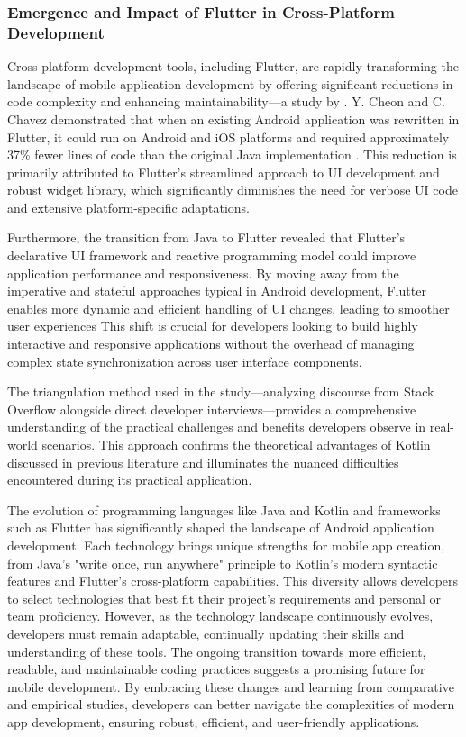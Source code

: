\subsubsection*{Emergence and Impact of Flutter in Cross-Platform Development}
Cross-platform development tools, including Flutter, are rapidly transforming the landscape of mobile application development by offering significant reductions in code complexity and enhancing maintainability—a study by \cite{cheon2021converting}.	Y. Cheon and C. Chavez demonstrated that when an existing Android application was rewritten in Flutter, it could run on Android and iOS platforms and required approximately 37\% fewer lines of code than the original Java implementation \cite{cheon2021converting}. This reduction is primarily attributed to Flutter's streamlined approach to UI development and robust widget library, which significantly diminishes the need for verbose UI code and extensive platform-specific adaptations.
\par
Furthermore, the transition from Java to Flutter revealed that Flutter's declarative UI framework and reactive programming model could improve application performance and responsiveness. By moving away from the imperative and stateful approaches typical in Android development, Flutter enables more dynamic and efficient handling of UI changes, leading to smoother user experiences \cite{nawrocki2021comparison} This shift is crucial for developers looking to build highly interactive and responsive applications without the overhead of managing complex state synchronization across user interface components. 
\par
The triangulation method used in the study—analyzing discourse from Stack Overflow alongside direct developer interviews—provides a comprehensive understanding of the practical challenges and benefits developers observe in real-world scenarios. This approach confirms the theoretical advantages of Kotlin discussed in previous literature and illuminates the nuanced difficulties encountered during its practical application.
\par
The evolution of programming languages like Java and Kotlin and frameworks such as Flutter has significantly shaped the landscape of Android application development. Each technology brings unique strengths for mobile app creation, from Java's "write once, run anywhere" principle to Kotlin's modern syntactic features and Flutter's cross-platform capabilities. This diversity allows developers to select technologies that best fit their project's requirements and personal or team proficiency. However, as the technology landscape continuously evolves, developers must remain adaptable, continually updating their skills and understanding of these tools. The ongoing transition towards more efficient, readable, and maintainable coding practices suggests a promising future for mobile development. By embracing these changes and learning from comparative and empirical studies, developers can better navigate the complexities of modern app development, ensuring robust, efficient, and user-friendly applications.
